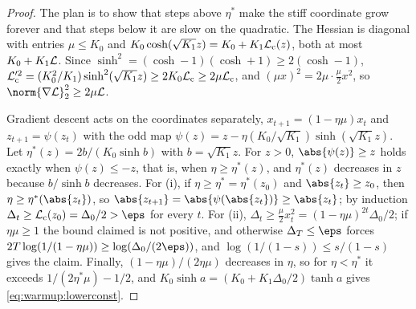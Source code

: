 \begin{refsection}

\begin{proof}
The plan is to show that steps above $\eta^*$ make the stiff coordinate grow forever and that steps below it are slow on the quadratic. The Hessian is diagonal with entries $\mu\le K_0$ and $K_0\cosh(\sqrt{K_1}z)=K_0+K_1\mathcal{L}_{\mathrm c}(z)$, both at most $K_0+K_1\mathcal{L}$. Since $\sinh^2=(\cosh-1)(\cosh+1)\ge2(\cosh-1)$, $\mathcal{L}_{\mathrm c}'^2=(K_0^2/K_1)\sinh^2(\sqrt{K_1}z)\ge2K_0\mathcal{L}_{\mathrm c}\ge2\mu\mathcal{L}_{\mathrm c}$, and $(\mu x)^2=2\mu\cdot\frac\mu2x^2$, so $\norm{\nabla\Loss}_2^2\ge2\mu\Loss$.

Gradient descent acts on the coordinates separately, $x_{t+1}=(1-\eta\mu)x_t$ and $z_{t+1}=\psi(z_t)$ with the odd map $\psi(z)=z-\eta(K_0/\sqrt{K_1})\sinh(\sqrt{K_1}z)$. Let $\eta^*(z)=2b/(K_0\sinh b)$ with $b=\sqrt{K_1}z$. For $z>0$, $\abs{\psi(z)}\ge z$ holds exactly when $\psi(z)\le-z$, that is, when $\eta\ge\eta^*(z)$, and $\eta^*(z)$ decreases in $z$ because $b/\sinh b$ decreases. For (i), if $\eta\ge\eta^*=\eta^*(z_0)$ and $\abs{z_t}\ge z_0$, then $\eta\ge\eta^*(\abs{z_t})$, so $\abs{z_{t+1}}=\abs{\psi(\abs{z_t})}\ge\abs{z_t}$; by induction $\Delta_t\ge\Loss_{\mathrm c}(z_0)=\Delta_0/2>\eps$ for every $t$. For (ii), $\Delta_t\ge\frac\mu2x_t^2=(1-\eta\mu)^{2t}\Delta_0/2$; if $\eta\mu\ge1$ the bound claimed is not positive, and otherwise $\Delta_T\le\eps$ forces $2T\log(1/(1-\eta\mu))\ge\log(\Delta_0/(2\eps))$, and $\log(1/(1-s))\le s/(1-s)$ gives the claim. Finally, $(1-\eta\mu)/(2\eta\mu)$ decreases in $\eta$, so for $\eta<\eta^*$ it exceeds $1/(2\eta^*\mu)-1/2$, and $K_0\sinh a=(K_0+K_1\Delta_0/2)\tanh a$ gives \eqref{eq:warmup:lowerconst}.
\end{proof}


\end{refsection}
